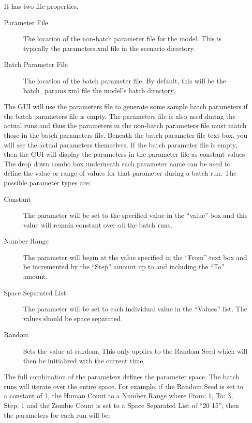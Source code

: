 \documentclass[11pt]{amsart}
\begin{document}
\noindent It has two file properties.

\begin{description}
\item[Parameter File] The location of the non-batch parameter file for the model. This is typically the parameters.xml file in the scenario directory.
\item[Batch Parameter File] The location of the batch parameter file. By default, this will be the batch\_params.xml file the model's batch directory.
\end{description}

The GUI will use the parameters file to generate some sample batch parameters if the batch parameters file is empty. The parameters file is also used during the actual runs and thus the parameters in the non-batch parameters file must match those in the batch parameters file. Beneath the batch parameter file text box, you will see the actual parameters themselves. If the batch parameter file is empty, then the GUI will display the parameters in the parameter file as constant values. The drop down combo box underneath each parameter name can be used to define the value or range of values for that parameter during a batch run. The possible parameter types are:

\begin{description}
\item[Constant] The parameter will be set to the specified value in the ``value'' box and this value will remain constant over all the batch runs.
\item[Number Range] The parameter will begin at the value specified in the ``From'' text box and be incremented by the ``Step'' amount up to and including the ``To'' amount.
\item[Space Separated List] The parameter will be set to each individual value in the ``Values'' list. The values should be space separated.
\item[Random] Sets the value at random. This only applies to the Random Seed which will then be initialized with the current time.
\end{description}

The full combination of the parameters defines the parameter space. The batch runs will iterate over the entire space. For example, if the
Random Seed is set to a constant of 1, the Human Count to a Number Range where From: 1, To: 3, Step: 1 and the Zombie Count is set to a Space Separated List of ``20 15'', then the parameters for each run will be:
\end{document}
